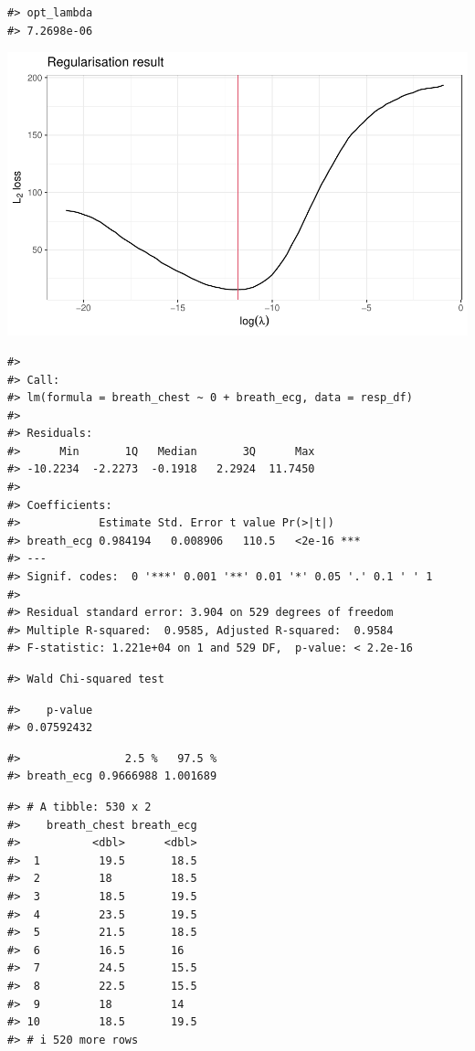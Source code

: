 \documentclass[
]{article}
\begin{document}
\begin{verbatim}
#> opt_lambda 
#> 7.2698e-06
\end{verbatim}

\begin{center}\includegraphics{report_files/figure-latex/resp-6} \end{center}

\begin{verbatim}
#> 
#> Call:
#> lm(formula = breath_chest ~ 0 + breath_ecg, data = resp_df)
#> 
#> Residuals:
#>      Min       1Q   Median       3Q      Max 
#> -10.2234  -2.2273  -0.1918   2.2924  11.7450 
#> 
#> Coefficients:
#>            Estimate Std. Error t value Pr(>|t|)    
#> breath_ecg 0.984194   0.008906   110.5   <2e-16 ***
#> ---
#> Signif. codes:  0 '***' 0.001 '**' 0.01 '*' 0.05 '.' 0.1 ' ' 1
#> 
#> Residual standard error: 3.904 on 529 degrees of freedom
#> Multiple R-squared:  0.9585, Adjusted R-squared:  0.9584 
#> F-statistic: 1.221e+04 on 1 and 529 DF,  p-value: < 2.2e-16
\end{verbatim}

\begin{verbatim}
#> Wald Chi-squared test
\end{verbatim}

\begin{verbatim}
#>    p-value 
#> 0.07592432
\end{verbatim}

\begin{verbatim}
#>                2.5 %   97.5 %
#> breath_ecg 0.9666988 1.001689
\end{verbatim}

\begin{verbatim}
#> # A tibble: 530 x 2
#>    breath_chest breath_ecg
#>           <dbl>      <dbl>
#>  1         19.5       18.5
#>  2         18         18.5
#>  3         18.5       19.5
#>  4         23.5       19.5
#>  5         21.5       18.5
#>  6         16.5       16  
#>  7         24.5       15.5
#>  8         22.5       15.5
#>  9         18         14  
#> 10         18.5       19.5
#> # i 520 more rows
\end{verbatim}
\end{document}

